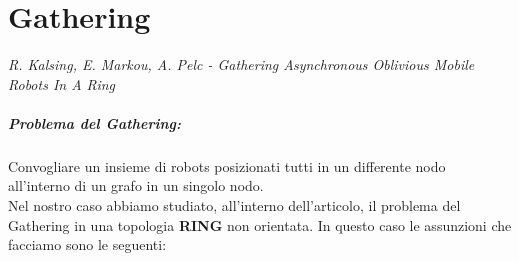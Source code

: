 \chapter{Gathering}
\emph{R. Kalsing, E. Markou, A. Pelc - Gathering Asynchronous Oblivious Mobile Robots In A Ring} 

\paragraph{Problema del Gathering:} Convogliare un insieme di robots posizionati
tutti in un differente nodo all'interno di un grafo in un singolo nodo.\\
Nel nostro caso abbiamo studiato, all'interno dell'articolo, il problema del
Gathering in una topologia \textbf{RING} non orientata. In questo caso le
assunzioni che facciamo sono le seguenti:
